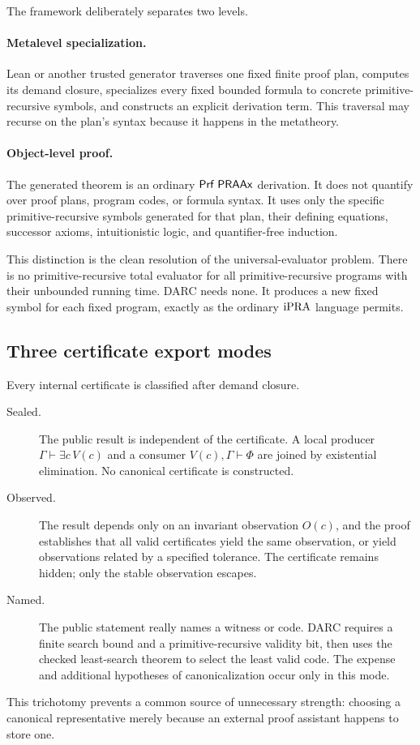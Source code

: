 The framework deliberately separates two levels.

\paragraph{Metalevel specialization.}
Lean or another trusted generator traverses one fixed finite proof plan,
computes its demand closure, specializes every fixed bounded formula to
concrete primitive-recursive symbols, and constructs an explicit derivation
term.  This traversal may recurse on the plan's syntax because it happens in
the metatheory.

\paragraph{Object-level proof.}
The generated theorem is an ordinary \(\mathsf{Prf}\;\mathsf{PRAAx}\) derivation.  It does not
quantify over proof plans, program codes, or formula syntax.  It uses only the
specific primitive-recursive symbols generated for that plan, their defining
equations, successor axioms, intuitionistic logic, and quantifier-free
induction.

This distinction is the clean resolution of the universal-evaluator problem.
There is no primitive-recursive total evaluator for all primitive-recursive
programs with their unbounded running time.  DARC needs none.  It produces a
new fixed symbol for each fixed program, exactly as the ordinary \(\mathrm{iPRA}\)
language permits.

\subsection{Three certificate export modes}

Every internal certificate is classified after demand closure.

\begin{description}
  \item[Sealed.] The public result is independent of the certificate.  A local
  producer \(\Gamma\vdash\exists c\,V(c)\) and a consumer
  \(V(c),\Gamma\vdash\Phi\) are joined by existential elimination.  No
  canonical certificate is constructed.

  \item[Observed.] The result depends only on an invariant observation
  \(O(c)\), and the proof establishes that all valid certificates yield the
  same observation, or yield observations related by a specified tolerance.
  The certificate remains hidden; only the stable observation escapes.

  \item[Named.] The public statement really names a witness or code.  DARC
  requires a finite search bound and a primitive-recursive validity bit, then
  uses the checked least-search theorem to select the least valid code.  The
  expense and additional hypotheses of canonicalization occur only in this
  mode.
\end{description}
This trichotomy prevents a common source of unnecessary strength: choosing a
canonical representative merely because an external proof assistant happens
to store one.

